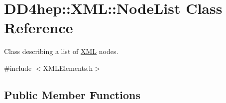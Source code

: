 \hypertarget{class_d_d4hep_1_1_x_m_l_1_1_node_list}{}\section{D\+D4hep\+:\+:X\+ML\+:\+:Node\+List Class Reference}
\label{class_d_d4hep_1_1_x_m_l_1_1_node_list}


Class describing a list of \hyperlink{namespace_d_d4hep_1_1_x_m_l}{X\+ML} nodes.  




{\ttfamily \#include $<$X\+M\+L\+Elements.\+h$>$}

\subsection*{Public Member Functions}
